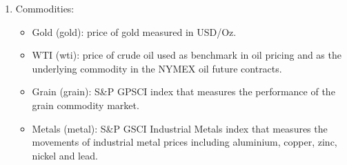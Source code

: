 \begin{enumerate}
\begin{itemize}
	\end{itemize}
	\item Commodities:
	\begin{itemize}
		\item Gold (gold): price of gold measured in USD/Oz.
		\item WTI (wti): price of crude oil used as benchmark in oil pricing and as the underlying commodity in the NYMEX oil future contracts.
		\item Grain (grain): S\&P GPSCI index that measures the performance of the grain commodity market.
		\item Metals (metal): S\&P GSCI Industrial Metals index that measures the movements of industrial metal prices including aluminium, copper, zinc, nickel and lead.
	\end{itemize}
\end{enumerate}

